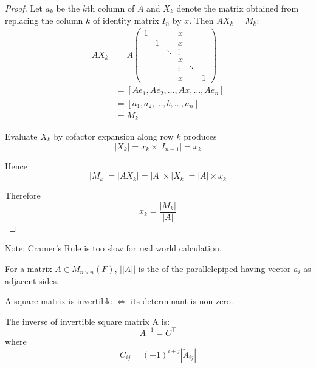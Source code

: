 \begin{proof}
	Let $a_k$ be the $k$th column of $A$ and $X_k$ denote the matrix obtained from replacing the column $k$ of identity matrix $I_n$ by $x$. Then $A X_k = M_k$:
	\begin{equation*}
	\begin{aligned}
        A X_k &= A \begin{pmatrix}
			1 &   &   & x &   \\
			 & 1 &  & x &   \\
			 && \ddots &  \vdots \\
			&&& x & \\
			&&& \vdots & \ddots \\
			&&& x&   & 1 
		\end{pmatrix} \\
		&= [Ae_1, Ae_2, \dots, Ax, \dots, Ae_n] \\
		& = [a_1, a_2, \dots, b, \dots, a_n] \\
		&= M_k
		\end{aligned}
    \end{equation*}
	
	
	Evaluate $X_k$ by cofactor expansion along row $k$ produces
	\begin{equation*}
		|X_k| = x_k \times |I_{n-1}| = x_k
	\end{equation*}
	
	Hence 
	\begin{equation*}
		|M_k| = |A X_k| = |A| \times |X_k| = |A| \times x_k
	\end{equation*}
	
	Therefore
	\begin{equation*}
		x_k = \frac{|M_k|}{|A|}
	\end{equation*}
\end{proof}

Note: Cramer's Rule is too slow for real world calculation.

\begin{theorem}
	For a matrix $A \in M_{n\times n}(F)$, $||A||$ is the  of the parallelepiped having vector $a_i$ as adjacent sides.
\end{theorem}


\begin{theorem}
    A square matrix is invertible $\iff$ its determinant is non-zero.
\end{theorem}

\begin{theorem}
    The inverse of invertible square matrix A is:
    \begin{equation*}
        A^{-1} = C^\top 
    \end{equation*}
    where 
    \begin{equation*}
        C_{ij} = (-1)^{i+j}|\tilde{A}_{ij}|
    \end{equation*}
\end{theorem}

